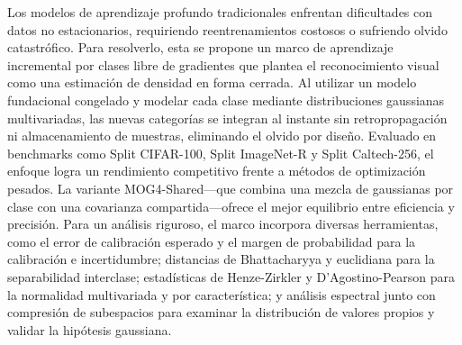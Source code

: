  
 \noindent Los modelos de aprendizaje profundo tradicionales enfrentan dificultades con datos no estacionarios, requiriendo reentrenamientos costosos o sufriendo olvido catastrófico. Para resolverlo, esta se propone un marco de aprendizaje incremental por clases libre de gradientes que plantea el reconocimiento visual como una estimación de densidad en forma cerrada. Al utilizar un modelo fundacional congelado y modelar cada clase mediante distribuciones gaussianas multivariadas, las nuevas categorías se integran al instante sin retropropagación ni almacenamiento de muestras, eliminando el olvido por diseño. Evaluado en benchmarks como Split CIFAR-100, Split ImageNet-R y Split Caltech-256, el enfoque logra un rendimiento competitivo frente a métodos de optimización pesados. La variante MOG4-Shared—que combina una mezcla de gaussianas por clase con una covarianza compartida—ofrece el mejor equilibrio entre eficiencia y precisión. Para un análisis riguroso, el marco incorpora diversas herramientas, como el error de calibración esperado y el margen de probabilidad para la calibración e incertidumbre; distancias de Bhattacharyya y euclidiana para la separabilidad interclase; estadísticas de Henze-Zirkler y D'Agostino-Pearson para la normalidad multivariada y por característica; y análisis espectral junto con compresión de subespacios para examinar la distribución de valores propios y validar la hipótesis gaussiana.
 
